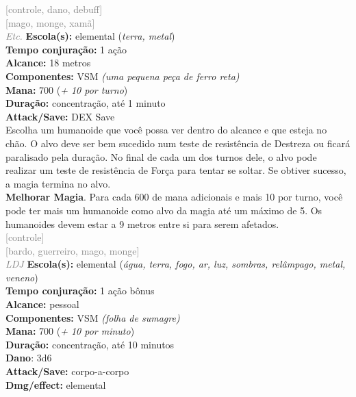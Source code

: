 \documentclass{RPG_Adventure}[2021/10/20]
\begin{document}
{\scriptsize \textcolor{gray}{[controle, dano, debuff]\\}}
{\scriptsize \textcolor{gray}{[mago, monge, xamã]\\}}
{\tiny \textcolor{gray}{\textit{Etc.}}}\jump{}
{\small \t \textbf{Escola(s):} elemental (\textit{terra, metal})\\\t \textbf{Tempo conjuração:} 1 ação\\\t \textbf{Alcance:} 18 metros\\\t \textbf{Componentes:} VSM \textit{(uma pequena peça de ferro reta)}\\\t \textbf{Mana:} 700 (\textit{+ 10 por turno})\\\t \textbf{Duração:} concentração, até 1 minuto\\\t \textbf{Attack/Save:} DEX Save\\}
{\normalsize Escolha um humanoide que você possa ver dentro do alcance e que esteja no chão. O alvo deve ser bem sucedido num teste de resistência de Destreza ou ficará paralisado pela duração. No final de cada um dos turnos dele, o alvo pode realizar um teste de resistência de Força para tentar se soltar. Se obtiver sucesso, a magia termina no alvo.\\\t \textbf{Melhorar Magia}. Para cada 600 de mana adicionais e mais 10 por turno, você pode ter mais um humanoide como alvo da magia até um máximo de 5. Os humanoides devem estar a 9 metros entre si para serem afetados.\\}
{\scriptsize \textcolor{gray}{[controle]\\}}
{\scriptsize \textcolor{gray}{[bardo, guerreiro, mago, monge]\\}}
{\tiny \textcolor{gray}{\textit{LDJ}}}\jump{}
{\small \t \textbf{Escola(s):} elemental (\textit{água, terra, fogo, ar, luz, sombras, relâmpago, metal, veneno})\\\t \textbf{Tempo conjuração:} 1 ação bônus\\\t \textbf{Alcance:} pessoal\\\t \textbf{Componentes:} VSM \textit{(folha de sumagre)}\\\t \textbf{Mana:} 700 (\textit{+ 10 por minuto})\\\t \textbf{Duração:} concentração, até 10 minutos\\\t \textbf{Dano}: 3d6\\\t \textbf{Attack/Save:} corpo-a-corpo\\\t \textbf{Dmg/effect:} elemental\\}
\end{document}
